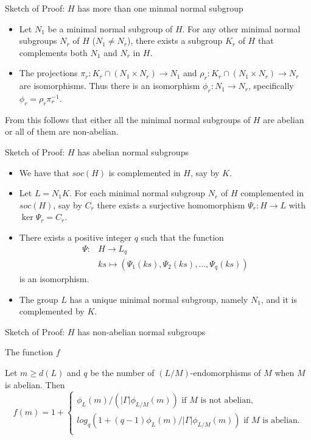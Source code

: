 \documentclass{beamer}
\newcommand{\card}[1]{| #1 |}
\begin{document}
\begin{frame}{Sketch of Proof: $H$ has more than one minmal normal subgroup}
    \begin{itemize}
        \item Let $N_1$ be a minimal normal subgroup of $H$. For any other minimal normal subgroups $N_r$ of $H$ ($N_1 \ne N_r$), there exists a subgroup $K_r$ of $H$ that complements both $N_1$ and $N_r$ in $H$.
        \item<2-> The projections $\pi_r : K_r \cap (N_1 \times N_r) \rightarrow N_1$ and $\rho_r : K_r \cap (N_1 \times N_r) \rightarrow N_r$ are isomorphisms. Thus there is an isomorphism $\phi_r : N_1 \rightarrow N_r$, specifically $\phi_r = \rho_r\pi_r^{-1}$.
    \end{itemize}
     From this follows that either all the minimal normal subgroups of $H$ are abelian or all of them are non-abelian.
\end{frame}

\begin{frame}{Sketch of Proof: $H$ has abelian normal subgroups}
    \begin{itemize}
        \item We have that $soc(H)$ is complemented in $H$, say by $K$.
        \item<2-> Let $L = N_1K$. For each minimal normal subgroup $N_r$ of $H$ complemented in $soc(H)$, say by $C_r$ there exists a surjective homomorphism $\Psi_r \colon H \rightarrow L$ with $\ker \Psi_r = C_r$.
        \item<3-> There exists a positive integer $q$ such that the function 
        \begin{align*}
            \Psi \colon &H \longrightarrow L_q \\
                     &ks \mapsto  (\Psi_1(ks),\Psi_2(ks),\ldots ,\Psi_q(ks))
        \end{align*} is an isomorphism.
        \item<4-> The group $L$ has a unique minimal normal subgroup, namely $N_1$, and it is complemented by $K$.
    \end{itemize}
\end{frame}

\begin{frame}{Sketch of Proof: $H$ has non-abelian normal subgroups}
\end{frame}

\begin{frame}{The function $f$}
    \begin{theorem}
        Let $m \ge d(L)$ and $q$ be the number of $(L/M)$-endomorphisms of $M$ when $M$ is abelian. Then 
        $$
        f(m) = 1 +
        \begin{cases}
            \phi_L(m)/(\card{\Gamma}\phi_{L/M}(m))  \text{ if } M \text{ is not abelian,} \\
            log_q(1+(q-1)\phi_L(m)/\card{\Gamma}\phi_{L/M}(m))  \text{ if } M \text{ is abelian.} \\
        \end{cases}
        $$
    \end{theorem}
\end{frame}
\end{document}
